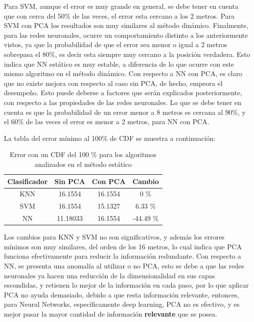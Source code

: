 Para SVM, aunque el error es muy grande en general, se debe tener en cuenta que con cerca del 50\% de las veces, el error esta cercano a los 2 metros. Para SVM con PCA los resultados son muy similares al método dinámico. Finalmente, para las redes neuronales, ocurre un comportamiento distinto a los anteriormente vistos, ya que la probabilidad de que el error sea menor o igual a 2 metros sobrepasa el 80\%, es decir esta siempre muy cercano a la posición verdadera. Esto indica que NN estático es muy estable, a diferencia de lo que ocurre con este mismo algoritmo en el método dinámico. Con respecto a NN con PCA, es claro que no existe mejora con respecto al caso sin PCA, de hecho, empeora el desempeño. Esto puede deberse a factores que serán explicados posteriormente, con respecto a las propiedades de las redes neuronales. Lo que se debe tener en cuenta es que la probabilidad de un error menor a 8 metros es cercana al 90\%, y el 60\% de las veces el error es menor a 2 metros, para NN con PCA.

La tabla del error mínimo al 100\% de CDF se muestra a continuación:

\begin{table}[!h]
\centering
\caption[Error con un CDF del 100 \% para los algoritmos analizados  en el método estático]{Error con un CDF del 100 \% para los algoritmos analizados  en el método estático}
\label{cambio-cdf-estatico}
\begin{tabular}{|c|c|c|c|}
\hline
Clasificador & Sin PCA  & Con PCA & Cambio    \\ \hline
KNN          & 16.1554  & 16.1554 & 0 \%      \\ \hline
SVM          & 16.1554  & 15.1327 & 6.33 \%   \\ \hline
NN           & 11.18033 & 16.1554 & -44.49 \% \\ \hline
\end{tabular}
\end{table}

Los cambios para KNN y SVM no son significativos, y además los errores mínimos son muy similares, del orden de los 16 metros, lo cual indica que PCA funciona efectivamente para reducir la información redundante. Con respecto a NN, se presenta una anomalía al utilizar o no PCA, esto se debe a que las redes neuronales ya hacen una reducción de la dimensionalidad en sus capas escondidas, y retienen lo mejor de la información en cada paso, por lo que aplicar PCA no ayuda demasiado, debido a que resta información relevante, entonces, para Neural Networks, específicamente deep learning, PCA no es efectivo, y es mejor pasar la mayor cantidad de información \textbf{relevante} que se posea.

